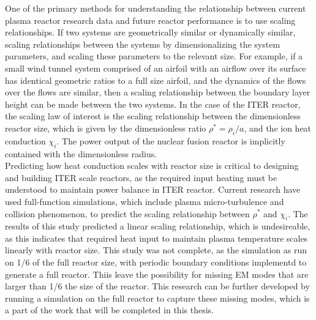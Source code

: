 \documentclass{article}
\begin{document}
One of the primary methods for understanding the relationship between current plasma reactor research data and future reactor performance is to use scaling relationships. 
If two systems are geometrically similar or dynamically similar, scaling relationships between the systems by dimensionalizing the system parameters, and scaling these parameters to the relevant size. 
For example, if a small wind tunnel system comprised of an airfoil with an airflow over its surface has identical geometric ratios to a full size airfoil, and the dynamics of the flows over the flows are similar, then a scaling relationship between the boundary layer height can be made between the two systems.
In the case of the ITER reactor, the scaling law of interest is the scaling relationship between the dimensionless reactor size, which is given by the dimensionless ratio $\rho^* = \rho_i/a$, and the ion heat conduction $\chi_i$.
The power output of the nuclear fusion reactor is implicitly contained with the dimensionless radius.\\ 
Predicting how heat conduction scales with reactor size is critical to designing and building ITER scale reactors, as the required input heating must be understood to maintain power balance in  ITER reactor.
Current research \cite{Yas_Ido} have used full-function simulations, which include plasma micro-turbulence and collision phenomenon, to predict the scaling relationship between $\rho^*$ and $\chi_i$. The results of this study predicted a linear scaling relationship, which is undesireable, as this indicates that required heat input to maintain plasma temperature scales linearly with reactor size. This study was not complete, as the simulation as run on 1/6 of the full reactor size, with periodic boundary conditions implementd to generate a full reactor. Thiis leave the possibility for missing EM modes that are larger than 1/6 the size of the reactor. This research can be further developed by running a simulation on the full reactor to capture these missing modes, which is a part of the work that will be completed in this thesis.\\
\end{document}
